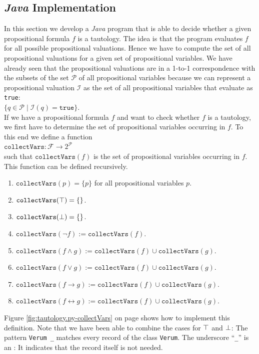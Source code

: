 \subsection{\textsl{Java} Implementation}
In this section we develop a \textsl{Java} program that is able to decide whether a given propositional
formula $f$ is a tautology.  The idea is that the program evaluates $f$ for all possible propositional
valuations.  Hence we have to compute the set of all propositional valuations for a given set of
propositional variables.  We have already seen that the propositional valuations are in a 1-to-1
correspondence with the subsets of the set $\mathcal{P}$ of all propositional variables because we can
represent a propositional valuation $\mathcal{I}$ as the set of all propositional variables that evaluate
as \texttt{true}:
\\[0.2cm]
\hspace*{1.3cm}
$\bigl\{ q \in \mathcal{P} \mid \mathcal{I}(q) = \mathtt{true} \bigr\}$.
\\[0.2cm]
If we have a propositional formula $f$ and want to check whether $f$ is a tautology, we first have to determine
the set of propositional variables occurring in $f$.
To this end we define a function
\\[0.2cm]
\hspace*{1.3cm}
$\texttt{collectVars}: \mathcal{F} \rightarrow 2^{\mathcal{P}}$
\\[0.2cm]
such that $\mathtt{collectVars}(f)$ is the set of propositional variables occurring in $f$.  This function can
be defined recursively.
\begin{enumerate}
\item $\mathtt{collectVars}(p) = \{ p \}$ \quad for all propositional variables $p$.
\item $\mathtt{collectVars}(\top) = \{\}$.
\item $\mathtt{collectVars}(\bot) = \{\}$.
\item $\mathtt{collectVars}(\neg f) := \mathtt{collectVars}(f)$.
\item $\mathtt{collectVars}(f \wedge g) := \mathtt{collectVars}(f) \cup \mathtt{collectVars}(g)$.
\item $\mathtt{collectVars}(f \vee g) := \mathtt{collectVars}(f) \cup \mathtt{collectVars}(g)$.
\item $\mathtt{collectVars}(f \rightarrow g) := \mathtt{collectVars}(f) \cup \mathtt{collectVars}(g)$.
\item $\mathtt{collectVars}(f \leftrightarrow g) := \mathtt{collectVars}(f) \cup \mathtt{collectVars}(g)$.
\end{enumerate}
Figure \ref{fig:tautology.py-collectVars} on page \pageref{fig:tautology.py-collectVars} shows how to implement
this definition.  Note that we have been able to combine the cases for $\top$ and $\bot$:  The pattern
\texttt{Verum \_} matches every record of the class \texttt{Verum}.  The underscore ``\texttt{\_}'' is an
:  It indicates that the record itself is not needed.

